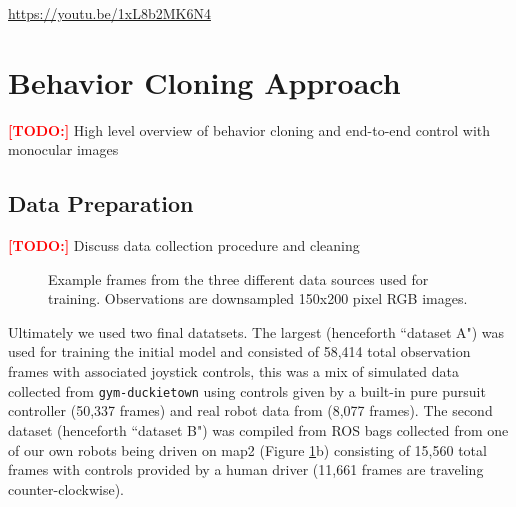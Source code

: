 \documentclass{article}
\newcommand\todo{\textcolor{red}{\textbf{[TODO:] }}}
\begin{document}
\url{https://youtu.be/1xL8b2MK6N4}

\section{Behavior Cloning Approach}
\todo High level overview of behavior cloning and end-to-end control with monocular images

\subsection{Data Preparation}

\todo Discuss data collection procedure and cleaning
\begin{figure}[H]
\centering
    \qquad
    \qquad
    \caption{Example frames from the three different data sources used for training. Observations are downsampled 150x200 pixel RGB images.}
    \label{fig:maps}
\end{figure}

Ultimately we used two final datatsets. The largest (henceforth ``dataset A") was used for training the initial model and consisted of 58,414 total observation frames with associated joystick controls, this was a mix of simulated data collected from \texttt{gym-duckietown} using controls given by a built-in pure pursuit controller (50,337 frames) and real robot data from (8,077 frames). The second dataset (henceforth ``dataset B") was compiled from ROS bags collected from one of our own robots being driven on map2 (Figure \ref{fig:maps}b) consisting of 15,560 total frames with controls provided by a human driver (11,661 frames are traveling counter-clockwise).
\end{document}
